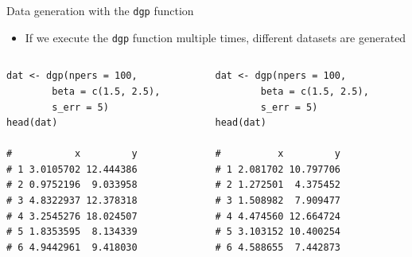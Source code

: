 \documentclass[aspectratio=169]{beamer}
\begin{document}
% 
\begin{frame}[fragile]{Data generation with the \textup{\texttt{dgp}} function}
  \begin{itemize}
    \item If we execute the \texttt{dgp} function multiple times, different
      datasets are generated
  \end{itemize}
\begin{columns}[T]
\begin{column}{0.4\textwidth}
\centering
\begin{lstlisting}
dat <- dgp(npers = 100, 
        beta = c(1.5, 2.5),
        s_err = 5)
head(dat)

#           x         y
# 1 3.0105702 12.444386
# 2 0.9752196  9.033958
# 3 4.8322937 12.378318
# 4 3.2545276 18.024507
# 5 1.8353595  8.134339
# 6 4.9442961  9.418030
\end{lstlisting}
\end{column}

\begin{column}{0.4\textwidth}
\centering
\begin{lstlisting}
dat <- dgp(npers = 100, 
        beta = c(1.5, 2.5),
        s_err = 5)
head(dat)

#          x         y
# 1 2.081702 10.797706
# 2 1.272501  4.375452
# 3 1.508982  7.909477
# 4 4.474560 12.664724
# 5 3.103152 10.400254
# 6 4.588655  7.442873
\end{lstlisting}
\end{column}
\end{columns}
\end{frame}
\end{document}
